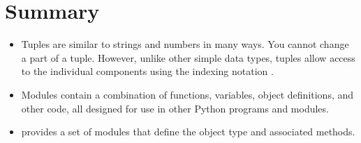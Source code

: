 \documentclass[letterpaper,10pt,english]{sphinxmanual}
\begin{document}
\begin{itemize}
\begin{sphinxVerbatim}[commandchars=\\\{\}]
  
    
      
\end{sphinxVerbatim}

\end{itemize}


\section{Summary}
\label{\detokenize{lecture_notes/lec07_modules_images:summary}}\begin{itemize}
\item {} 
Tuples are similar to strings and numbers in many ways. You cannot
change a part of a tuple. However, unlike other simple data types,
tuples allow access to the individual components using the indexing
notation \sphinxcode{\sphinxupquote{{[} {]}}}.

\item {} 
Modules contain a combination of functions, variables, object
definitions, and other code, all designed for use in other Python
programs and modules.

\item {} 
 provides a set of modules that define the  object
type and associated methods.

\end{itemize}
\end{document}
